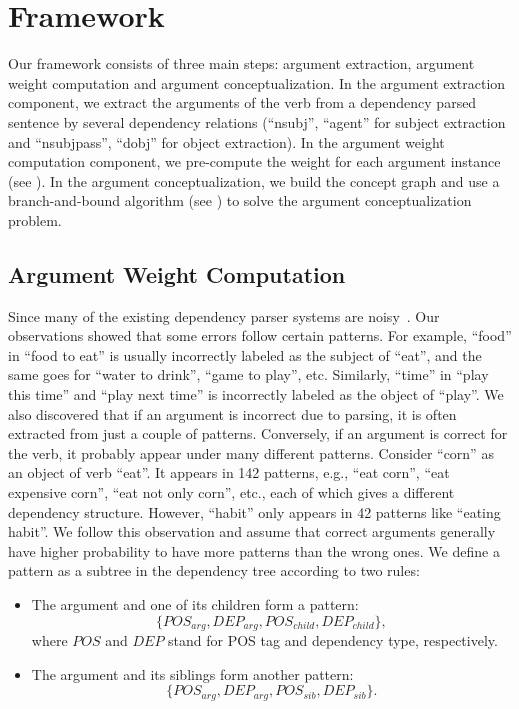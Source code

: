 \section{Framework}
\label{sec:algo}
Our framework consists of three main steps:
argument extraction, argument weight computation and
argument conceptualization.
In the argument extraction component, we extract the arguments
of the verb from a dependency parsed sentence by several
dependency relations (``nsubj'', ``agent''
for subject extraction and ``nsubjpass'', ``dobj'' for object extraction).
In the argument weight computation component,
we pre-compute the weight for each argument instance
(see ). In the argument conceptualization, we
build the concept graph and use a branch-and-bound algorithm
(see )
to solve the argument conceptualization problem.

\subsection{Argument Weight Computation}
\label{sec:qe}
Since many of the existing dependency parser systems are noisy~\cite{manning2014stanford}.
Our observations showed that some errors follow certain patterns.
For example, ``food'' in ``food to eat''
is usually incorrectly labeled as the subject of ``eat'',
and the same goes for ``water to drink'', ``game to play'', etc.
Similarly, ``time'' in ``play this time'' and ``play next time''
is incorrectly labeled as the object of ``play''.
We also discovered that if an argument is incorrect due to parsing,
it is often extracted from just a couple of patterns. Conversely,
if an argument is correct for the verb, it probably appear under
many different patterns.
Consider ``corn'' as an object of verb ``eat''.
It appears in 142 patterns, e.g., ``eat corn'', ``eat expensive corn'', ``eat not only corn'',
etc., each of which gives a different dependency structure.  However,
``habit'' only appears in 42 patterns like ``eating habit''.
We follow this observation and assume that correct arguments
generally have higher probability to have more patterns than the wrong ones.
We define a pattern as a subtree in the dependency tree
according to two rules:
\begin{itemize}
\item The argument and one of its children
form a pattern:
$$\{POS_{arg}, DEP_{arg}, POS_{child}, DEP_{child}\},$$
where $POS$ and $DEP$ stand for POS tag and dependency type, respectively.
\item The argument and its siblings form another pattern:
$$\{POS_{arg}, DEP_{arg}, POS_{sib}, DEP_{sib}\}.$$
\end{itemize}

